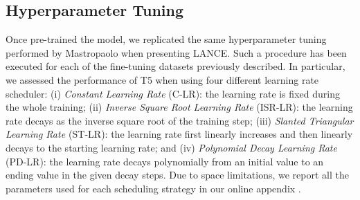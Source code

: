\subsection{Hyperparameter Tuning}
Once pre-trained the model, we replicated the same hyperparameter tuning performed by Mastropaolo \etal \cite{mastropaolo2021studying} when presenting LANCE. Such a procedure has been executed for each of the fine-tuning datasets previously described. In particular, we assessed the performance of T5 when using four different learning rate scheduler: (i) \textit{Constant Learning Rate} (C-LR): the learning rate is fixed during the whole training; (ii) \textit{Inverse Square Root Learning Rate} (ISR-LR): the learning rate decays as the inverse square root of the training step; (iii) \textit{Slanted Triangular Learning Rate \cite{howard2018universal}} (ST-LR): the learning rate first linearly increases and then linearly decays to the starting learning rate; and (iv) \textit{Polynomial Decay Learning Rate} (PD-LR): the learning rate decays polynomially from an initial value to an ending value in the given decay steps. Due to space limitations, we report all the parameters used for each scheduling strategy in our online appendix \cite{replication}.


